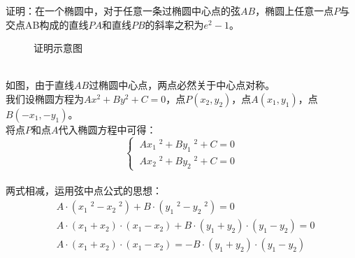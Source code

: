 \documentclass[UTF8]{ctexart}
\begin{document}
    证明：在一个椭圆中，对于任意一条过椭圆中心点的弦$AB$，椭圆上任意一点$P$与交点AB构成的直线$PA$和直线$PB$的斜率之积为$e^2-1$。
    \begin{figure}[h]
        \begin{center}
            \caption{证明示意图}
        \end{center}
    \end{figure}\\
    如图，由于直线$AB$过椭圆中心点，两点必然关于中心点对称。\\[3mm]
    我们设椭圆方程为$Ax^2+By^2+C=0$，点$P(x_2,y_2)$，点$A(x_1,y_1)$，点$B(-x_1,-y_1)$。\\[5mm]
    将点$P$和点$A$代入椭圆方程中可得：
    \setcounter{equation}{0}
    \begin{equation}
        \begin{cases}
            ~Ax_1\;^2+By_1\;^2+C=0\\[1mm]
            ~Ax_2\;^2+By_2\;^2+C=0
        \end{cases}
    \end{equation}\\
    两式相减，运用弦中点公式的思想：
    \begin{align}
        &A\cdot\left(x_1\;^2-x_2\;^2\right)+B\cdot\left(y_1\;^2-y_2\;^2\right)=0\\[3mm]
        &A\cdot(x_1+x_2)\cdot(x_1-x_2)+B\cdot(y_1+y_2)\cdot(y_1-y_2)=0\\[3mm]
        &A\cdot(x_1+x_2)\cdot(x_1-x_2)=-B\cdot(y_1+y_2)\cdot(y_1-y_2)
    \end{align}

\newpage
\end{document}

